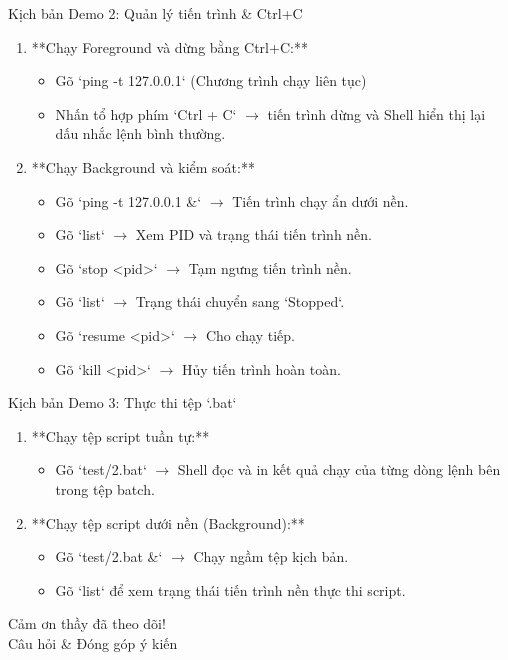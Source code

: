 \documentclass{beamer}
\begin{document}
\begin{frame}{Kịch bản Demo 2: Quản lý tiến trình \& Ctrl+C}
    \begin{enumerate}
        \item **Chạy Foreground và dừng bằng Ctrl+C:**
              \begin{itemize}
                  \item Gõ `ping -t 127.0.0.1` (Chương trình chạy liên tục)
                  \item Nhấn tổ hợp phím `Ctrl + C` $\rightarrow$ tiến trình dừng và Shell hiển thị lại dấu nhắc lệnh bình thường.
              \end{itemize}
        \item **Chạy Background và kiểm soát:**
              \begin{itemize}
                  \item Gõ `ping -t 127.0.0.1 &` $\rightarrow$ Tiến trình chạy ẩn dưới nền.
                  \item Gõ `list` $\rightarrow$ Xem PID và trạng thái tiến trình nền.
                  \item Gõ `stop <pid>` $\rightarrow$ Tạm ngưng tiến trình nền.
                  \item Gõ `list` $\rightarrow$ Trạng thái chuyển sang `Stopped`.
                  \item Gõ `resume <pid>` $\rightarrow$ Cho chạy tiếp.
                  \item Gõ `kill <pid>` $\rightarrow$ Hủy tiến trình hoàn toàn.
              \end{itemize}
    \end{enumerate}
\end{frame}

\begin{frame}{Kịch bản Demo 3: Thực thi tệp `.bat`}
    \begin{enumerate}
        \item **Chạy tệp script tuần tự:**
              \begin{itemize}
                  \item Gõ `test/2.bat` $\rightarrow$ Shell đọc và in kết quả chạy của từng dòng lệnh bên trong tệp batch.
              \end{itemize}
        \item **Chạy tệp script dưới nền (Background):**
              \begin{itemize}
                  \item Gõ `test/2.bat &` $\rightarrow$ Chạy ngầm tệp kịch bản.
                  \item Gõ `list` để xem trạng thái tiến trình nền thực thi script.
              \end{itemize}
    \end{enumerate}
\end{frame}

\begin{frame}
    \begin{center}
        \Huge \color{customBlue} Cảm ơn thầy đã theo dõi!\\
        \vspace{1cm}
        \Large Câu hỏi \& Đóng góp ý kiến
    \end{center}
\end{frame}
\end{document}
